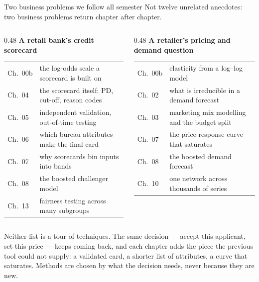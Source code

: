 \documentclass[aspectratio=169,11pt]{beamer}
\begin{document}
\begin{frame}{Two business problems we follow all semester}
  \scriptsize
  Not twelve unrelated anecdotes: two business problems return chapter after chapter.
  \vspace{0.6ex}

  \begin{columns}[t]
  \begin{column}{0.48\textwidth}
    \textbf{A retail bank's credit scorecard}\\[0.4ex]
    \begin{tabular}{@{}p{1.0cm}p{5.9cm}@{}}
      \toprule
      Ch.~00b & the log-odds scale a scorecard is built on \\
      Ch.~04  & the scorecard itself: PD, cut-off, reason codes \\
      Ch.~05  & independent validation, out-of-time testing \\
      Ch.~06  & which bureau attributes make the final card \\
      Ch.~07  & why scorecards bin inputs into bands \\
      Ch.~08  & the boosted challenger model \\
      Ch.~13  & fairness testing across many subgroups \\
      \bottomrule
    \end{tabular}
  \end{column}
  \begin{column}{0.48\textwidth}
    \textbf{A retailer's pricing and demand question}\\[0.4ex]
    \begin{tabular}{@{}p{1.0cm}p{5.9cm}@{}}
      \toprule
      Ch.~00b & elasticity from a log--log model \\
      Ch.~02  & what is irreducible in a demand forecast \\
      Ch.~03  & marketing mix modelling and the budget split \\
      Ch.~07  & the price-response curve that saturates \\
      Ch.~08  & the boosted demand forecast \\
      Ch.~10  & one network across thousands of series \\
      \bottomrule
    \end{tabular}
  \end{column}
  \end{columns}
  \vspace{0.8ex}

  \begin{industry}
    Neither list is a tour of techniques. The same decision --- accept this applicant, set this
    price --- keeps coming back, and each chapter adds the piece the previous tool could not
    supply: a validated card, a shorter list of attributes, a curve that saturates. Methods are
    chosen by what the decision needs, never because they are new.
  \end{industry}
\end{frame}
\end{document}

